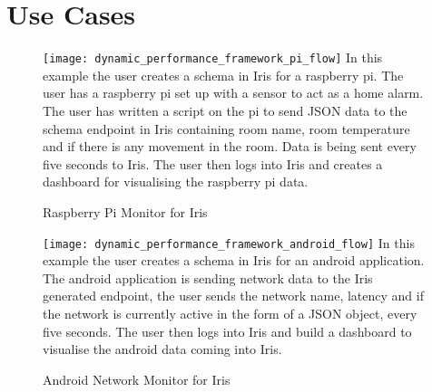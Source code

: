 \documentclass[12pt,a4paper,titlepage]{report}
\begin{document}
\section{Use Cases}
\begin{figure}[H]
\begin{tcolorbox}
\texttt{[image: dynamic\_performance\_framework\_pi\_flow]}
In this example the user creates a schema in Iris for a raspberry pi. The user has a raspberry pi set up with a sensor to act as a home alarm. The user has written a script on the pi to send JSON data to the schema endpoint in Iris containing room name, room temperature and if there is any movement in the room. Data is being sent every five seconds to Iris. The user then logs into Iris and creates a dashboard for visualising the raspberry pi data.
\end{tcolorbox}
\caption{Raspberry Pi Monitor for Iris}
\end{figure}
\begin{figure}[H]
\begin{tcolorbox}
\texttt{[image: dynamic\_performance\_framework\_android\_flow]}
In this example the user creates a schema in Iris for an android application. The android application is sending network data to the Iris generated endpoint, the user sends the network name, latency and if the network is currently active in the form of a JSON object, every five seconds. The user then logs into Iris and build a dashboard to visualise the android data coming into Iris.
\end{tcolorbox}
\caption{Android Network Monitor for Iris}
\end{figure}
\end{document}
